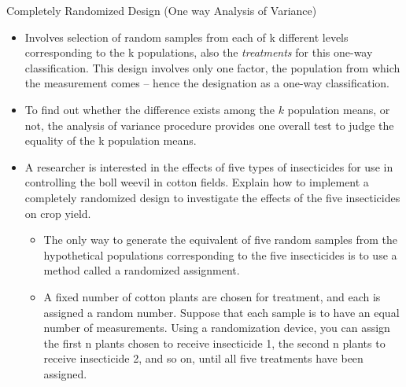 \documentclass[
  ignorenonframetext,
  aspectratio=169]{beamer}
\providecommand{\tightlist}{%
  \setlength{\itemsep}{0pt}\setlength{\parskip}{0pt}}
\begin{document}
\begin{frame}{Completely Randomized Design (One way Analysis of
Variance)}
\protect\hypertarget{completely-randomized-design-one-way-analysis-of-variance}{}
\begin{itemize}
\tightlist
\item
  Involves selection of random samples from each of k different levels
  corresponding to the k populations, also the \emph{treatments} for
  this one-way classification. This design involves only one factor, the
  population from which the measurement comes -- hence the designation
  as a one-way classification.
\item
  To find out whether the difference exists among the \(k\) population
  means, or not, the analysis of variance procedure provides one overall
  test to judge the equality of the k population means.
\end{itemize}
\end{frame}

\begin{frame}{}
\protect\hypertarget{section-1}{}
\small

\begin{itemize}
\tightlist
\item
  A researcher is interested in the effects of five types of
  insecticides for use in controlling the boll weevil in cotton fields.
  Explain how to implement a completely randomized design to investigate
  the effects of the five insecticides on crop yield.

  \begin{itemize}
  \tightlist
  \item
    The only way to generate the equivalent of five random samples from
    the hypothetical populations corresponding to the five insecticides
    is to use a method called a randomized assignment.
  \item
    A fixed number of cotton plants are chosen for treatment, and each
    is assigned a random number. Suppose that each sample is to have an
    equal number of measurements. Using a randomization device, you can
    assign the first n plants chosen to receive insecticide 1, the
    second n plants to receive insecticide 2, and so on, until all five
    treatments have been assigned.
  \end{itemize}
\end{itemize}
\end{frame}
\end{document}
